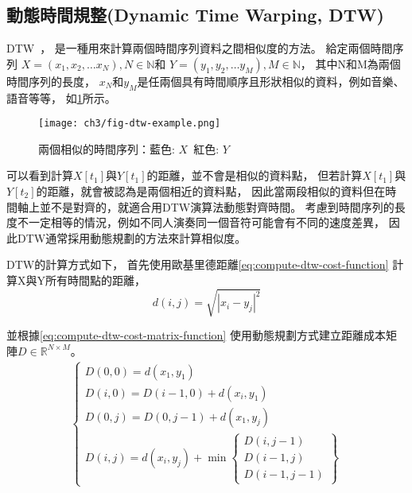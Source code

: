 \documentclass[class=NCU_thesis, crop=false]{standalone}
\begin{document}
\subsection{動態時間規整(Dynamic Time Warping, DTW)} \label{ch3-subst-DTW}
DTW~\cite{Sakoe1978Dynamic}，
是一種用來計算兩個時間序列資料之間相似度的方法。
給定兩個時間序列
$X = (x_1, x_2, \dots x_N), N \in \mathbb{N}$和
$Y = (y_1, y_2, \dots y_M), M \in \mathbb{N}$，
其中N和M為兩個時間序列的長度，
$x_N$和$y_M$是任兩個具有時間順序且形狀相似的資料，例如音樂、語音等等，
如\cref{fig:fig-ch3-dtw-example}所示。
\begin{figure}[!hbt]
    \centering
    \texttt{[image: ch3/fig-dtw-example.png]}
    \caption{兩個相似的時間序列：藍色: $X$\ 紅色: $Y$}
    \label{fig:fig-ch3-dtw-example}
\end{figure}

可以看到計算$X[t_1]$與$Y[t_1]$的距離，並不會是相似的資料點，
但若計算$X[t_1]$與$Y[t_2]$的距離，就會被認為是兩個相近的資料點，
因此當兩段相似的資料但在時間軸上並不是對齊的，就適合用DTW演算法動態對齊時間。
考慮到時間序列的長度不一定相等的情況，例如不同人演奏同一個音符可能會有不同的速度差異，
因此DTW通常採用動態規劃的方法來計算相似度。

DTW的計算方式如下，
首先使用歐基里德距離\cref{eq:compute-dtw-cost-function}
計算X與Y所有時間點的距離，
\begin{equation}
    \label{eq:compute-dtw-cost-function}
    d(i, j) = \sqrt{\left\lvert x_i-y_j\right\rvert^{2}}
\end{equation}

並根據\cref{eq:compute-dtw-cost-matrix-function}
使用動態規劃方式建立距離成本矩陣$D \in \mathbb{R}^{N \times M}$。
\begin{align}
    \label{eq:compute-dtw-cost-matrix-function}
    \left\{
        \begin{array}{l}
            D(0, 0) = d(x_1, y_1)\\
            D(i, 0) = D(i-1, 0)+d(x_i, y_1)\\
            D(0, j) = D(0, j-1)+d(x_1, y_j)\\
            D(i, j) = d(x_i, y_j) + \min \left\{
                \begin{array}{l}
                    D(i, j-1) \\
                    D(i-1, j) \\
                    D(i-1, j-1)
                \end{array}\right\}
        \end{array}
    \right.
\end{align}
\end{document}
